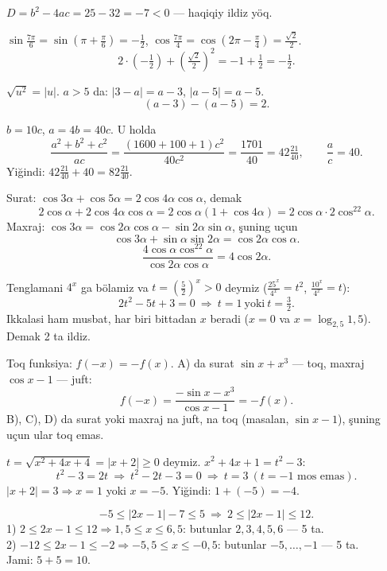 $D=b^2-4ac=25-32=-7<0$ — haqiqiy ildiz yöq.

$\sin\frac{7\pi}6=\sin\!\left(\pi+\frac\pi6\right)=-\frac12$, \quad $\cos\frac{7\pi}4=\cos\!\left(2\pi-\frac\pi4\right)=\frac{\sqrt2}2$.
\[2\cdot\left(-\tfrac12\right)+\left(\tfrac{\sqrt2}{2}\right)^2=-1+\tfrac12=-\tfrac12.\]

$\sqrt{u^2}=|u|$. $a>5$ da: $|3-a|=a-3$, $|a-5|=a-5$.
\[(a-3)-(a-5)=2.\]

$b=10c$, $a=4b=40c$. U holda
\[\frac{a^2+b^2+c^2}{ac}=\frac{(1600+100+1)c^2}{40c^2}=\frac{1701}{40}=42\tfrac{21}{40},\qquad \frac ac=40.\]
Yiğindi: $42\frac{21}{40}+40=82\frac{21}{40}$.

Surat: $\cos3\alpha+\cos5\alpha=2\cos4\alpha\cos\alpha$, demak
\[2\cos\alpha+2\cos4\alpha\cos\alpha=2\cos\alpha(1+\cos4\alpha)=2\cos\alpha\cdot2\cos^22\alpha.\]
Maxraj: $\cos3\alpha=\cos2\alpha\cos\alpha-\sin2\alpha\sin\alpha$, şuning uçun
\[\cos3\alpha+\sin\alpha\sin2\alpha=\cos2\alpha\cos\alpha.\]
\[\frac{4\cos\alpha\cos^22\alpha}{\cos2\alpha\cos\alpha}=4\cos2\alpha.\]

Tenglamani $4^x$ ga bölamiz va $t=\left(\frac52\right)^x>0$ deymiz ($\frac{25^x}{4^x}=t^2$, $\frac{10^x}{4^x}=t$):
\[2t^2-5t+3=0\ \Rightarrow\ t=1\ \text{yoki}\ t=\tfrac32.\]
Ikkalasi ham musbat, har biri bittadan $x$ beradi ($x=0$ va $x=\log_{2{,}5}1{,}5$). Demak 2 ta ildiz.

Toq funksiya: $f(-x)=-f(x)$. A) da surat $\sin x+x^3$ — toq, maxraj $\cos x-1$ — juft:
\[f(-x)=\frac{-\sin x-x^3}{\cos x-1}=-f(x).\]
B), C), D) da surat yoki maxraj na juft, na toq (masalan, $\sin x-1$), şuning uçun ular toq emas.

$t=\sqrt{x^2+4x+4}=|x+2|\ge0$ deymiz. $x^2+4x+1=t^2-3$:
\[t^2-3=2t\ \Rightarrow\ t^2-2t-3=0\ \Rightarrow\ t=3\ (t=-1 \text{ mos emas}).\]
$|x+2|=3\Rightarrow x=1$ yoki $x=-5$. Yiğindi: $1+(-5)=-4$.

\[-5\le|2x-1|-7\le5\ \Rightarrow\ 2\le|2x-1|\le12.\]
1) $2\le2x-1\le12\Rightarrow 1{,}5\le x\le6{,}5$: butunlar $2,3,4,5,6$ — 5 ta.\\
2) $-12\le2x-1\le-2\Rightarrow -5{,}5\le x\le-0{,}5$: butunlar $-5,\dots,-1$ — 5 ta.\\
Jami: $5+5=10$.

